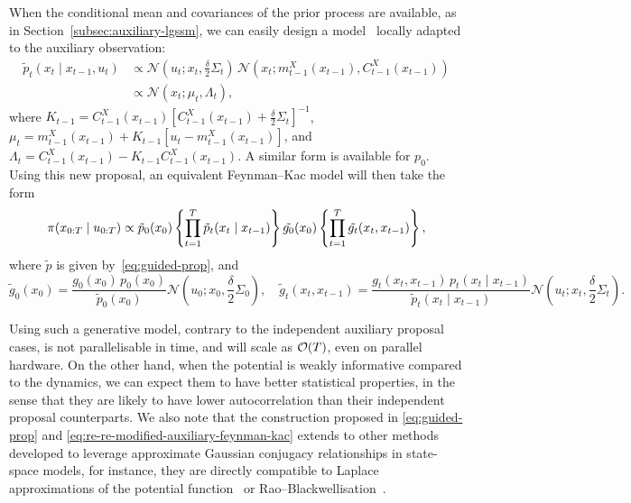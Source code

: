 When the conditional mean and covariances of the prior process are available, as in Section~\ref{subsec:auxiliary-lgssm}, we can easily design a model~\citep[this is called a guided proposal in][Section 10.3.2]{Chopin2020book} locally adapted to the auxiliary observation:
\begin{equation}
    \label{eq:guided-prop}
    \begin{split}
        \tilde{p}_t(x_t \mid x_{t-1}, u_t)
        &\propto \mathcal{N}\left(u_t; x_t, \frac{\delta}{2} \Sigma_t \right) \,\mathcal{N}\left(x_t; m^X_{t-1}(x_{t-1}), C^X_{t-1}(x_{t-1})\right)\\
        &\propto \mathcal{N}\left(x_t; \mu_t, \Lambda_t\right),
    \end{split}
\end{equation}
where $K_{t-1} = C^X_{t-1}(x_{t-1}) \left[C^X_{t-1}(x_{t-1}) + \frac{\delta}{2}\Sigma_t\right]^{-1}$, $\mu_t = m^X_{t-1}(x_{t-1}) + K_{t-1}[u_t - m^X_{t-1}(x_{t-1})]$, and $\Lambda_t = C^X_{t-1}(x_{t-1}) - K_{t-1} C^X_{t-1}(x_{t-1})$. A similar form is available for $p_0$.
Using this new proposal, an equivalent Feynman--Kac model will then take the form
\begin{equation}
    \label{eq:re-re-modified-auxiliary-feynman-kac}
    \pi(x_{0:T} \mid u_{0:T})
    \propto \tilde{p}_0(x_0)\left\{\prod_{t=1}^T \tilde{p}_t(x_t \mid x_{t-1})\right\}\tilde{g_0}(x_0) \left\{\prod_{t=1}^T \tilde{g_t}(x_t, x_{t-1}) \right\},
\end{equation}
where $\tilde{p}$ is given by~\eqref{eq:guided-prop}, and
\begin{equation}
    \tilde{g}_0(x_0) = \frac{g_0(x_0) \, p_0(x_0)}{\tilde{p}_0(x_0)}\mathcal{N}\left(u_0; x_0, \frac{\delta}{2} \Sigma_0 \right), \quad \tilde{g}_t(x_t, x_{t-1}) = \frac{g_t(x_t, x_{t-1}) \, p_t(x_t \mid x_{t-1})}{\tilde{p}_t(x_t \mid x_{t-1})}\mathcal{N}\left(u_t; x_t, \frac{\delta}{2} \Sigma_t \right).
\end{equation}

Using such a generative model, contrary to the independent auxiliary proposal cases, is not parallelisable in time, and will scale as $\mathcal{O}(T)$, even on parallel hardware. On the other hand, when the potential is weakly informative compared to the dynamics, we can expect them to have better statistical properties, in the sense that they are likely to have lower autocorrelation than their independent proposal counterparts. We also note that the construction proposed in \eqref{eq:guided-prop} and \eqref{eq:re-re-modified-auxiliary-feynman-kac} extends to other methods developed to leverage approximate Gaussian conjugacy relationships in state-space models, for instance, they are directly compatible to Laplace approximations of the potential function~\citep[see, e.g.][Section 10.5.3]{Chopin2020book} or Rao--Blackwellisation~\citep{Murphy2001}.

